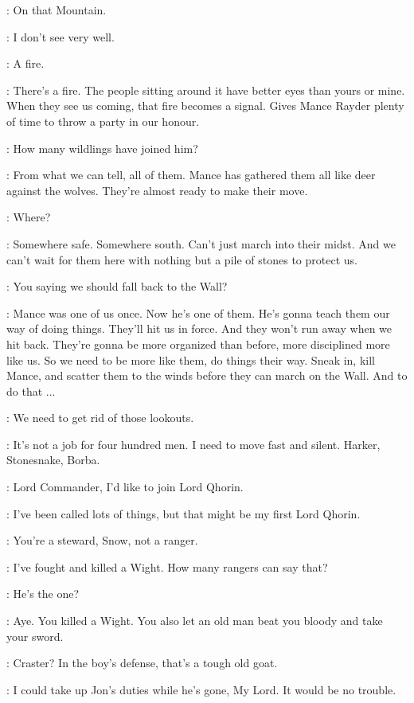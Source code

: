 \HALFHAND: On that Mountain. 

\SAM: I don't see very well. 

\JON: A fire. 

\HALFHAND: There's a fire. The people sitting around it have better eyes than yours or mine. When they see us coming, that fire becomes a signal. Gives Mance Rayder plenty of time to throw a party in our honour. 

\JEOR: How many wildlings have joined him? 

\HALFHAND: From what we can tell, all of them. Mance has gathered them all like deer against the wolves. They're almost ready to make their move. 

\JON: Where? 

\HALFHAND: Somewhere safe. Somewhere south. Can't just march into their midst. And we can't wait for them here with nothing but a pile of stones to protect us. 

\JEOR: You saying we should fall back to the Wall? 

\HALFHAND: Mance was one of us once. Now he's one of them. He's gonna teach them our way of doing things. They'll hit us in force. And they won't run away when we hit back. They're gonna be more organized than before, more disciplined more like us. So we need to be more like them, do things their way. Sneak in, kill Mance, and scatter them to the winds before they can march on the Wall. And to do that $\ldots$ 

\JEOR: We need to get rid of those lookouts. 

\HALFHAND: It's not a job for four hundred men. I need to move fast and silent. Harker, Stonesnake, Borba. 

\JON: Lord Commander, I'd like to join Lord Qhorin. 

\HALFHAND: I've been called lots of things, but that might be my first Lord Qhorin. 

\JEOR: You're a steward, Snow, not a ranger. 

\JON: I've fought and killed a Wight. How many rangers can say that? 

\HALFHAND: He's the one? 

\JEOR: Aye. You killed a Wight. You also let an old man beat you bloody and take your sword. 


\HALFHAND: Craster? In the boy's defense, that's a tough old goat. 

\SAM: I could take up Jon's duties while he's gone, My Lord. It would be no trouble. 

